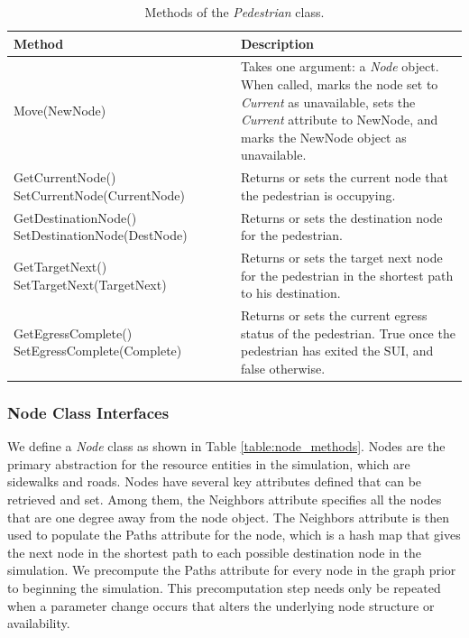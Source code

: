 \documentclass[12pt]{article}
\begin{document}
\def\arraystretch{1.5}
\begin{table}
  \centering
    \begin{tabular}{p{0.5\linewidth}p{0.5\linewidth}}
     \hline
     Method & Description \\
     \hline
     Move(NewNode) & Takes one argument: a \textit{Node} object. When called,
                     marks the node set to \textit{Current} as unavailable,
                     sets the \textit{Current} attribute to NewNode,
                     and marks the NewNode object as unavailable. \\
     GetCurrentNode() \newline SetCurrentNode(CurrentNode) & Returns or sets
                        the current node that the pedestrian is occupying. \\
     GetDestinationNode() \newline SetDestinationNode(DestNode) & Returns or
                        sets the destination node for the pedestrian. \\
     GetTargetNext() \newline SetTargetNext(TargetNext) & Returns or
                       sets the target next node for the pedestrian in the
                       shortest path to his destination. \\
     GetEgressComplete() \newline SetEgressComplete(Complete) & Returns or
                        sets the current egress status of the pedestrian. True
                        once the pedestrian has exited the SUI, and false
                        otherwise. \\
     \hline
    \end{tabular}
    \caption{Methods of the \textit{Pedestrian} class.}
  \label{table:pedestrian_methods}
\end{table}

\subsubsection{Node Class Interfaces}
We define a \textit{Node} class as shown in Table \ref{table:node_methods}.
Nodes are the primary abstraction for the resource entities in the simulation,
which are sidewalks and roads. Nodes have several key attributes defined that
can be retrieved and set. Among them, the Neighbors attribute specifies all the
nodes that are one degree away from the node object. The Neighbors attribute is
then used to populate the Paths attribute for the node, which is a hash map
that gives the next node in the shortest path to each possible destination node
in the simulation. We precompute the Paths attribute for every node in the
graph prior to beginning the simulation. This precomputation step needs only
be repeated when a parameter change occurs that alters the underlying node
structure or availability.
\end{document}
